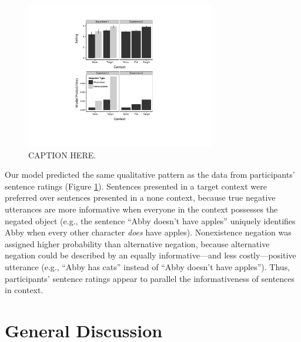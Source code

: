 \documentclass[10pt,letterpaper]{article}
\begin{document}
\begin{figure}[t]
\begin{center} 
\includegraphics[width=3.25in]{figures/modelcomp.pdf}
\caption{\label{fig:modelvdata} CAPTION HERE.}
\end{center} 
\end{figure}

Our model predicted the same qualitative pattern as the data from participants' sentence ratings (Figure \ref{fig:modelvdata}).  Sentences presented in a target context were preferred over sentences presented in a none context, because true negative utterances are more informative when everyone in the context possesses the negated object (e.g., the sentence ``Abby doesn't have apples'' uniquely identifies Abby when every other character \emph{does} have apples).  Nonexistence negation was assigned higher probability than alternative negation, because alternative negation could be described by an equally informative---and less costly---positive utterance (e.g., ``Abby has cats'' instead of ``Abby doesn't have apples'').  Thus, participants' sentence ratings appear to parallel the informativeness of sentences in context.  

 


\section{General Discussion}



\setlength{\bibleftmargin}{.125in}
\setlength{\bibindent}{-\bibleftmargin}


\end{document}
